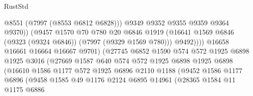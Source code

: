 \begin{lexlean}{RustStd}
\begin{coremodule}
{\begin{coremodule}
{{{{{{{{{{{{{{{{{{{{{{{{{{{{{{{{{{{{{{{{{{{                                      @8551
                                      (@7997 (@8553 @6812 @6828)))
                                    @9349
                                    @9352
                                    @9355
                                    @9359
                                    @9364
                                    @9370))
                                (@9457
                                  @1570
                                  @70
                                  @780
                                  @20
                                  @6846
                                  @1919
                                  (@16641
                                    @1569
                                    @6846
                                    (@9323 (@9324 @6846))
                                    (@7997 (@9329 @1569 @780)))
                                  @9492))))
                          @16658
                          @16661
                          @16664
                          @16667
                          @9701)
                        (@27745
                          @6852
                          @1590
                          @574
                          @572
                          @1925
                          @6898
                          @1925
                          @3016
                          (@27669
                            @1587
                            @640
                            @574
                            @572
                            @1925
                            @6898
                            @1925
                            @6898
                            (@16610
                              @1586
                              @1177
                              @572
                              @1925
                              @6896
                              @2110
                              @1188
                              (@9452
                                @1586
                                @1177
                                @6896
                                (@9458
                                  @1585
                                  @49
                                  @1176
                                  @2124
                                  @6895
                                  @14961
                                  (@28365
                                    @1584
                                    @11
                                    @1175
                                    @6886
}}}}}}}}}}}}}}}}}}}}}}}}}}}}}}}}}}}}}}}}}}}
\end{coremodule}}
\end{coremodule}
\end{lexlean}
